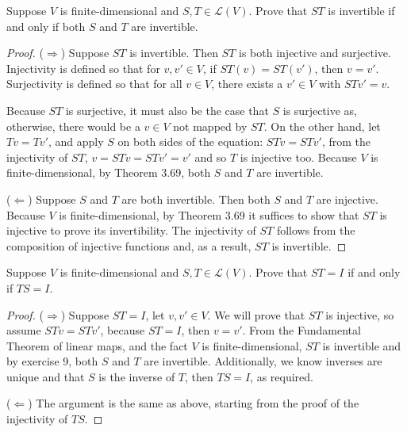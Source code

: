 \begin{exercise}{9}
  Suppose $V$ is finite-dimensional and $S,T\in\mathcal{L}(V)$. Prove that $ST$ is invertible if and only if both $S$ and $T$ are invertible.
\end{exercise}
\begin{proof}
 ($\Rightarrow$) Suppose $ST$ is invertible. Then $ST$ is both injective and surjective. Injectivity is defined so that for $v,v'\in V$, if $ST(v)=ST(v')$, then $v=v'$. Surjectivity is defined so that for all $v\in V$, there exists a $v'\in V$ with $STv'=v$. 
 
 Because $ST$ is surjective, it must also be the case that $S$ is surjective as, otherwise, there would be a $v\in V$ not mapped by $ST$. On the other hand, let $Tv=Tv'$, and apply $S$ on both sides of the equation: $STv=STv'$, from the injectivity of $ST$, $v=STv=STv'=v'$ and so $T$ is injective too. Because $V$ is finite-dimensional, by Theorem 3.69, both $S$ and $T$ are invertible.
 
 ($\Leftarrow$) Suppose $S$ and $T$ are both invertible. Then both $S$ and $T$ are injective. Because $V$ is finite-dimensional, by Theorem 3.69 it suffices to show that $ST$ is injective to prove its invertibility. The injectivity of $ST$ follows from the composition of injective functions and, as a result, $ST$ is invertible.
\end{proof}


\begin{exercise}{10}
  Suppose $V$ is finite-dimensional and $S,T\in\mathcal{L}(V)$. Prove that $ST=I$ if and only if $TS=I$.
\end{exercise}
\begin{proof}
 ($\Rightarrow$) Suppose $ST=I$, let $v, v'\in V$. We will prove that $ST$ is injective, so assume $STv=STv'$, because $ST=I$, then $v=v'$. From the Fundamental Theorem of linear maps, and the fact $V$ is finite-dimensional, $ST$ is invertible and by exercise 9, both $S$ and $T$ are invertible. Additionally, we know inverses are unique and that $S$ is the inverse of $T$, then $TS=I$, as required.
 
 ($\Leftarrow$) The argument is the same as above, starting from the proof of the injectivity of $TS$.
\end{proof}


